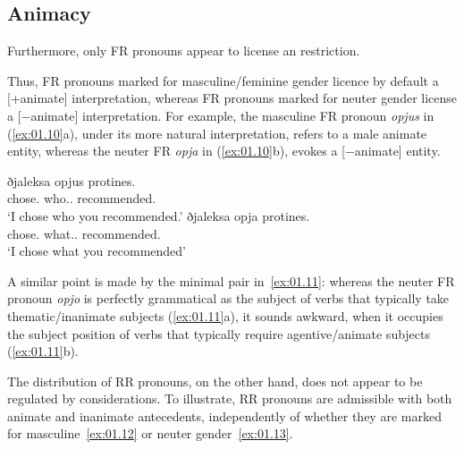 \documentclass[output=paper]{langsci/langscibook}
\begin{document}
\subsection{Animacy}
Furthermore, only \gls{FR} pronouns appear to
license an  restriction.

Thus, \gls{FR} pronouns marked for masculine/feminine gender licence by default
a [+animate] interpretation, whereas \gls{FR} pronouns  marked for neuter
gender license a [−animate] interpretation. For example, the masculine \gls{FR}
pronoun \emph{opjus} in (\ref{ex:01.10}a), under its more natural interpretation, refers to
a male animate entity, whereas the neuter \gls{FR} \emph{opja} in (\ref{ex:01.10}b), evokes
a [−animate] entity.\largerpage[2]

\ea {}\label{ex:01.10}
	\ea
		\gll ðjaleksa opjus protines.\\
			chose.\Fsg{} who.\M{}.\Pl{} recommended.\Ssg{}\\
		\glt \enquote*{I chose who you recommended.}
	\ex
		\gll ðjaleksa opja protines.\\
			chose.\Fsg{} what.\glossN.\Pl{} recommended.\Ssg{}\\
		\glt \enquote*{I chose what you recommended}
	\z
\z

A similar point is made by the minimal pair in~\eqref{ex:01.11}: whereas
the neuter \gls{FR} pronoun \emph{opjo} is perfectly grammatical as the subject
of verbs that typically take thematic/inanimate subjects (\ref{ex:01.11}a),
it sounds awkward, when it occupies the subject position of verbs that
typically require agentive/animate subjects (\ref{ex:01.11}b).

\ea {}\label{ex:01.11}\judgewidth{\#\#}
	\z
\z

The distribution of \gls{RR} pronouns, on the other hand, does not appear to be
regulated by  considerations. To illustrate, \gls{RR} pronouns are
admissible with both animate and inanimate antecedents, independently of
whether they are marked for masculine~\eqref{ex:01.12} or neuter
gender~\eqref{ex:01.13}.
\end{document}
